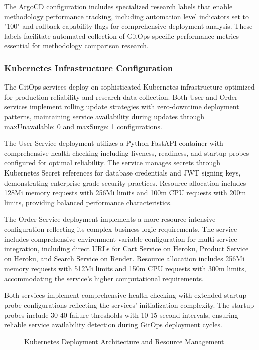 The ArgoCD configuration includes specialized research labels that enable methodology performance tracking, including automation level indicators set to "100" and rollback capability flags for comprehensive deployment analysis. These labels facilitate automated collection of GitOps-specific performance metrics essential for methodology comparison research.

\subsubsection{Kubernetes Infrastructure Configuration}

The GitOps services deploy on sophisticated Kubernetes infrastructure optimized for production reliability and research data collection. Both User and Order services implement rolling update strategies with zero-downtime deployment patterns, maintaining service availability during updates through maxUnavailable: 0 and maxSurge: 1 configurations.

The User Service deployment utilizes a Python FastAPI container with comprehensive health checking including liveness, readiness, and startup probes configured for optimal reliability. The service manages secrets through Kubernetes Secret references for database credentials and JWT signing keys, demonstrating enterprise-grade security practices. Resource allocation includes 128Mi memory requests with 256Mi limits and 100m CPU requests with 200m limits, providing balanced performance characteristics.

The Order Service deployment implements a more resource-intensive configuration reflecting its complex business logic requirements. The service includes comprehensive environment variable configuration for multi-service integration, including direct URLs for Cart Service on Heroku, Product Service on Heroku, and Search Service on Render. Resource allocation includes 256Mi memory requests with 512Mi limits and 150m CPU requests with 300m limits, accommodating the service's higher computational requirements.

Both services implement comprehensive health checking with extended startup probe configurations reflecting the services' initialization complexity. The startup probes include 30-40 failure thresholds with 10-15 second intervals, ensuring reliable service availability detection during GitOps deployment cycles.

\begin{figure}[H]
\centering
\caption{Kubernetes Deployment Architecture and Resource Management}
\label{fig:kubernetes-deployment-architecture}
\end{figure}

